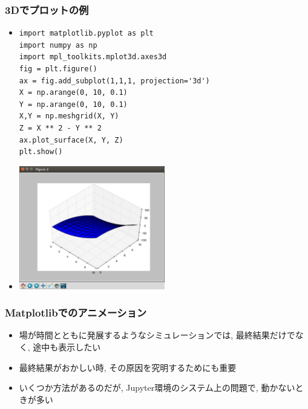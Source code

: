 \documentclass[10pt,dvipdfmx]{beamer}
\newcommand{\aka}[1]{{\color{red}#1}}
\begin{document}
\begin{frame}[fragile]
\frametitle{\aka{3D}でプロットの例}

\begin{itemize}
\item []
\begin{lstlisting}[basicstyle = \ttfamily\scriptsize]
import matplotlib.pyplot as plt
import numpy as np
import mpl_toolkits.mplot3d.axes3d
fig = plt.figure()
ax = fig.add_subplot(1,1,1, projection='3d')
X = np.arange(0, 10, 0.1)
Y = np.arange(0, 10, 0.1)
X,Y = np.meshgrid(X, Y)
Z = X ** 2 - Y ** 2
ax.plot_surface(X, Y, Z)
plt.show()
\end{lstlisting}

\item []
\begin{center}
\includegraphics[width=0.5\textwidth]{out/pdf/img/plot_surface.pdf}
\end{center}
\end{itemize}
\end{frame}

\begin{frame}[fragile]
  \frametitle{Matplotlibでのアニメーション}
  \begin{itemize}
  \item 場が時間とともに発展するようなシミュレーションでは, 最終結果だけでなく, 途中も表示したい
  \item 最終結果がおかしい時,
    その原因を究明するためにも重要
  \item いくつか方法があるのだが,
    Jupyter環境のシステム上の問題で,
    動かないときが多い
  \end{itemize}
\end{frame}
\end{document}
